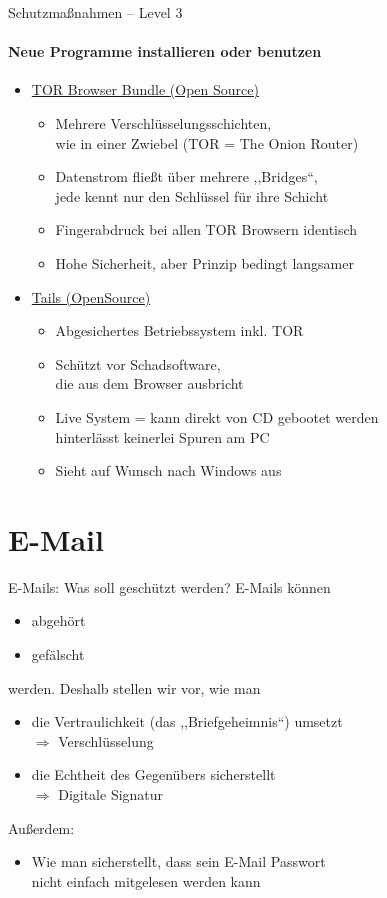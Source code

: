   \begin{frame}{Schutzmaßnahmen -- Level 3}
  \framesubtitle{Neue Programme installieren oder benutzen}
    \begin{itemize}
      \item \href{https://www.torproject.org}{TOR Browser Bundle (Open Source)}
      \begin{itemize}
        \item Mehrere Verschlüsselungsschichten,\\ wie in einer Zwiebel (TOR = The Onion Router)
        \item Datenstrom fließt über mehrere ,,Bridges``,\\ jede kennt nur den Schlüssel für ihre Schicht
        \item Fingerabdruck bei allen TOR Browsern identisch
        \item Hohe Sicherheit, aber Prinzip bedingt langsamer
      \end{itemize}
      \item \href{https://tails.boum.org}{Tails (OpenSource)}
      \begin{itemize}
        \item Abgesichertes Betriebssystem inkl. TOR
        \item Schützt vor Schadsoftware,\\ die aus dem Browser ausbricht
        \item Live System = kann direkt von CD gebootet werden\\ hinterlässt keinerlei Spuren am PC
        \item Sieht auf Wunsch nach Windows aus
      \end{itemize}
    \end{itemize}
  \end{frame}

\section{E-Mail}
  \begin{frame}{E-Mails: Was soll geschützt werden?}
    E-Mails können
    \begin{itemize}
      \item abgehört
      \item gefälscht
    \end{itemize}
    werden. Deshalb stellen wir vor, wie man
    \begin{itemize}
      \item die Vertraulichkeit (das ,,Briefgeheimnis``) umsetzt
      \\ $\Rightarrow$ Verschlüsselung
      \item die Echtheit des Gegenübers sicherstellt
      \\ $\Rightarrow$ Digitale Signatur
    \end{itemize}
    Außerdem:
    \begin{itemize}
      \item Wie man sicherstellt, dass sein E-Mail Passwort\\ nicht einfach mitgelesen werden kann
    \end{itemize}
  \end{frame}

